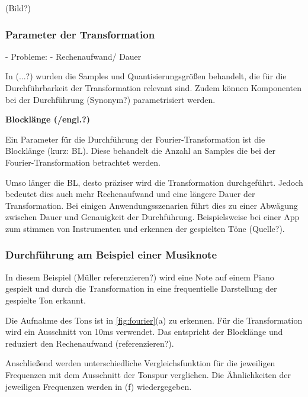 %
(Bild?)
%

\subsubsection{Parameter der Transformation}

 - Probleme:
    - Rechenaufwand/ Dauer

In (...?) wurden die Samples und Quantisierungsgrößen behandelt, die für die Durchführbarkeit der Transformation relevant sind. Zudem können Komponenten bei der Durchführung (Synonym?) parametrisiert werden.

\par

%
\textbf{Blocklänge (/engl.?)}
%

Ein Parameter für die Durchführung der Fourier-Transformation ist die Blocklänge (kurz: BL). Diese behandelt die Anzahl an Samples die bei der Fourier-Transformation betrachtet werden. 

\par

Umso länger die BL, desto präziser wird die Transformation durchgeführt. Jedoch bedeutet dies auch mehr Rechenaufwand und eine längere Dauer der Transformation. Bei einigen Anwendungsszenarien führt dies zu einer Abwägung zwischen Dauer und Genauigkeit der Durchführung. Beispielsweise bei einer App zum stimmen von Instrumenten und erkennen der gespielten Töne (Quelle?).

\par

\subsubsection{Durchführung am Beispiel einer Musiknote}

In diesem Beispiel (Müller referenzieren?) wird eine Note auf einem Piano gespielt und durch die Transformation in eine frequentielle Darstellung der gespielte Ton erkannt.

\par

Die Aufnahme des Tons ist in \cref{fig:fourier}(a) zu erkennen. Für die Transformation wird ein Ausschnitt von 10ms verwendet. Das entspricht der Blocklänge und reduziert den Rechenaufwand (referenzieren?).

\par

Anschließend werden unterschiedliche Vergleichsfunktion für die jeweiligen Frequenzen mit dem Ausschnitt der Tonspur verglichen. Die Ähnlichkeiten der jeweiligen Frequenzen werden in (f) wiedergegeben.

